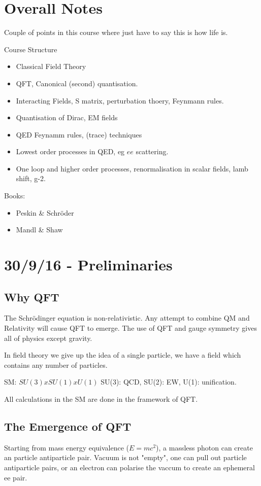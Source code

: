 \documentclass[]{article}
\begin{document}
\large

\section*{Overall Notes}

Couple of points in this course where just have to say this is how life is.

Course Structure
\begin{itemize}
	\item Classical Field Theory
	\item QFT, Canonical (second) quantisation.
	\item Interacting Fields, S matrix, perturbation thoery, Feynmann rules.
	\item Quantisation of Dirac, EM fields
	\item QED Feynamm rules, (trace) techniques
	\item Lowest order processes in QED, eg $ee$ scattering.
	\item One loop and higher order processes, renormalisation in scalar fields, lamb shift, g-2.
\end{itemize}

Books:
\begin{itemize}
	\item Peskin \& Schr\"{o}der
	\item Mandl \& Shaw
\end{itemize}

\section{30/9/16 - Preliminaries}	

	\subsection{Why QFT}
	The Schr\"{o}dinger equation is non-relativistic.
	Any attempt to combine QM and Relativity will cause QFT to emerge. 
	The use of QFT and gauge symmetry gives all of physics except gravity.
	
	In field theory we give up the idea of a single particle, we have a field which contains any number of particles. 
	
	SM: $SU(3)xSU(1)xU(1)$
	SU(3): QCD, SU(2): EW, U(1): unification.
	
	All calculations in the SM are done in the framework of QFT.
	
	\subsection{The Emergence of QFT}
	Starting from mass energy equivalence ($E=mc^2$), a massless photon can create an particle antiparticle pair. Vacuum is not "empty", one can pull out particle antiparticle pairs, or an electron can polarise the vaccum to create an ephemeral ee pair.  
	
\end{document}
